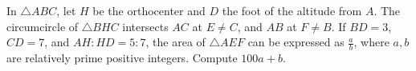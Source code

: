 In $\triangle ABC$, let $H$ be the orthocenter and $D$ the foot of the altitude from $A$. The circumcircle of $\triangle BHC$ intersects $AC$ at $E \neq C$, and $AB$ at $F \neq B$. If $BD = 3$, $CD = 7$, and $AH : HD = 5 : 7$, the area of $\triangle AEF$ can be expressed as $\frac{a}{b}$, where $a, b$ are relatively prime positive integers. Compute $100a + b$.
